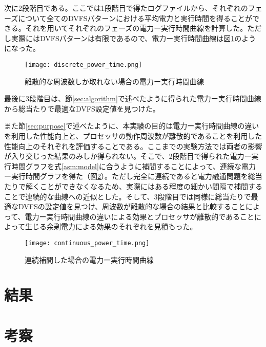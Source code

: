 次に2段階目である。ここでは1段階目で得たログファイルから、それぞれのフェーズについて全てのDVFSパターンにおける平均電力と実行時間を得ることができる。それを用いてそれぞれのフェーズの電力ー実行時間曲線を計算した。ただし実際にはDVFSパターンは有限であるので、電力ー実行時間曲線は図\ref{fig:discrete_power_time}のようになった。

\begin{figure}[t]
 \begin{center}
  \texttt{[image: discrete\_power\_time.png]}
 \end{center}
 \caption{離散的な周波数しか取れない場合の電力ー実行時間曲線}
 \label{fig:discrete_power_time}
\end{figure}

最後に3段階目は、節\ref{sec:algorithm}で述べたように得られた電力ー実行時間曲線から総当たりで最適なDVFS設定値を見つけた。

また節\ref{sec:purpose}で述べたように、本実験の目的は電力ー実行時間曲線の違いを利用した性能向上と、プロセッサの動作周波数が離散的であることを利用した性能向上のそれぞれを評価することである。ここまでの実験方法では両者の影響が入り交じった結果のみしか得られない。そこで、2段階目で得られた電力ー実行時間グラフを式\ref{asm:model}に合うように補間することによって、連続な電力ー実行時間グラフを得た（図\ref{fig:continuous_power_time}）。ただし完全に連続であると電力融通問題を総当たりで解くことができなくなるため、実際にはある程度の細かい間隔で補間することで連続的な曲線への近似とした。そして、3段階目では同様に総当たりで最適なDVFSの設定値を見つけ、周波数が離散的な場合の結果と比較することによって、電力ー実行時間曲線の違いによる効果とプロセッサが離散的であることによって生じる余剰電力による効果のそれぞれを見積もった。

\begin{figure}[t]
 \begin{center}
  \texttt{[image: continuous\_power\_time.png]}
 \end{center}
 \caption{連続補間した場合の電力ー実行時間曲線}
 \label{fig:continuous_power_time}
\end{figure}




\section{結果}
\label{sec:result}



\section{考察}
\label{sec:discussion}











